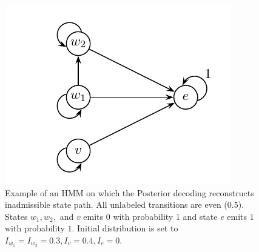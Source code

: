 \begin{figure}
\begin{center}
\includegraphics{../figures/posteriorInadmissibleStatePath.pdf}
\end{center}
\caption[Hidden Markov Model on which posterior decoding reconstructs
inadmissible state path]{
Example of an HMM on which the Posterior decoding reconstructs inadmissible state path. 
All unlabeled transitions are even ($0.5$). States $w_1,w_2,$ and $v$ emits $0$
with probability $1$ and state $e$ emits $1$ with probability $1$.
Initial distribution is set to $I_{w_1}=I_{w_2}=0.3, I_{v}=0.4, I_{e}=0$.
}\label{FIGURE:INADMISSIBLESTATEPATH}
\end{figure}


